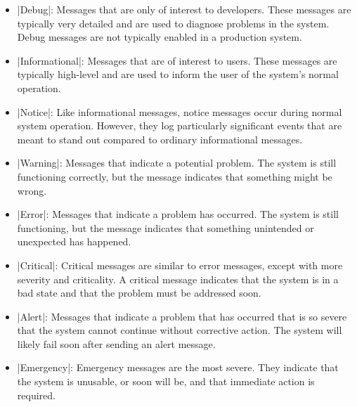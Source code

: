 \begin{itemize}
\item |Debug|: Messages that are only of interest to developers. These messages are typically
  very detailed and are used to diagnose problems in the system. Debug messages are not
  typically enabled in a production system.

\item |Informational|: Messages that are of interest to users. These messages are typically high-level
  and are used to inform the user of the system's normal operation.

\item |Notice|: Like informational messages, notice messages occur during normal system
  operation. However, they log particularly significant events that are meant to stand out
  compared to ordinary informational messages.

\item |Warning|: Messages that indicate a potential problem. The system is still functioning
  correctly, but the message indicates that something might be wrong.

\item |Error|: Messages that indicate a problem has occurred. The system is still functioning,
  but the message indicates that something unintended or unexpected has happened.

\item |Critical|: Critical messages are similar to error messages, except with more severity and
  criticality. A critical message indicates that the system is in a bad state and that the
  problem must be addressed soon.

\item |Alert|: Messages that indicate a problem that has occurred that is so severe that the
  system cannot continue without corrective action. The system will likely fail soon after
  sending an alert message.

\item |Emergency|: Emergency messages are the most severe. They indicate that the system is
  unusable, or soon will be, and that immediate action is required.
\end{itemize}
